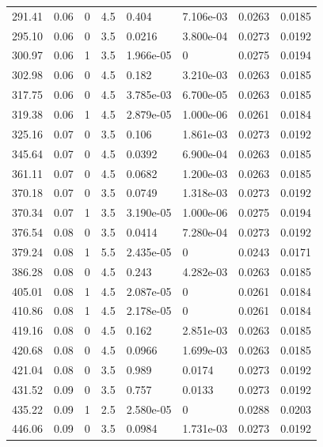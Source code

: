 \documentclass[preview]{standalone}
\begin{document}
{{{\begin{tabular}{L{1.2cm}C{1.2cm} C{0.3cm}C{0.5cm} C{1.4cm}C{1.4cm} C{1.4cm}C{1.4cm}}
  291.41  &  0.06  & 0     & 4.5 &  0.404  & 7.106e-03  & 0.0263 &  0.0185   \\ 
  295.10  &  0.06  & 0     & 3.5 &  0.0216  & 3.800e-04  & 0.0273 &  0.0192   \\ 
  300.97  &  0.06  & 1     & 3.5 &  1.966e-05  & 0  & 0.0275 &  0.0194   \\ 
  302.98  &  0.06  & 0     & 4.5 &  0.182  & 3.210e-03  & 0.0263 &  0.0185   \\ 
  317.75  &  0.06  & 0     & 4.5 &  3.785e-03  & 6.700e-05  & 0.0263 &  0.0185   \\ 
  319.38  &  0.06  & 1     & 4.5 &  2.879e-05  & 1.000e-06  & 0.0261 &  0.0184   \\ 
  325.16  &  0.07  & 0     & 3.5 &  0.106  & 1.861e-03  & 0.0273 &  0.0192   \\ 
  345.64  &  0.07  & 0     & 4.5 &  0.0392  & 6.900e-04  & 0.0263 &  0.0185   \\ 
  361.11  &  0.07  & 0     & 4.5 &  0.0682  & 1.200e-03  & 0.0263 &  0.0185   \\ 
  370.18  &  0.07  & 0     & 3.5 &  0.0749  & 1.318e-03  & 0.0273 &  0.0192   \\ 
  370.34  &  0.07  & 1     & 3.5 &  3.190e-05  & 1.000e-06  & 0.0275 &  0.0194   \\ 
  376.54  &  0.08  & 0     & 3.5 &  0.0414  & 7.280e-04  & 0.0273 &  0.0192   \\ 
  379.24  &  0.08  & 1     & 5.5 &  2.435e-05  & 0  & 0.0243 &  0.0171   \\ 
  386.28  &  0.08  & 0     & 4.5 &  0.243  & 4.282e-03  & 0.0263 &  0.0185   \\ 
  405.01  &  0.08  & 1     & 4.5 &  2.087e-05  & 0  & 0.0261 &  0.0184   \\ 
  410.86  &  0.08  & 1     & 4.5 &  2.178e-05  & 0  & 0.0261 &  0.0184   \\ 
  419.16  &  0.08  & 0     & 4.5 &  0.162  & 2.851e-03  & 0.0263 &  0.0185   \\ 
  420.68  &  0.08  & 0     & 4.5 &  0.0966  & 1.699e-03  & 0.0263 &  0.0185   \\ 
  421.04  &  0.08  & 0     & 3.5 &  0.989  & 0.0174  & 0.0273 &  0.0192   \\ 
  431.52  &  0.09  & 0     & 3.5 &  0.757  & 0.0133  & 0.0273 &  0.0192   \\ 
  435.22  &  0.09  & 1     & 2.5 &  2.580e-05  & 0  & 0.0288 &  0.0203   \\ 
  446.06  &  0.09  & 0     & 3.5 &  0.0984  & 1.731e-03  & 0.0273 &  0.0192   \\ 

\end{tabular}}}}
\end{document}
